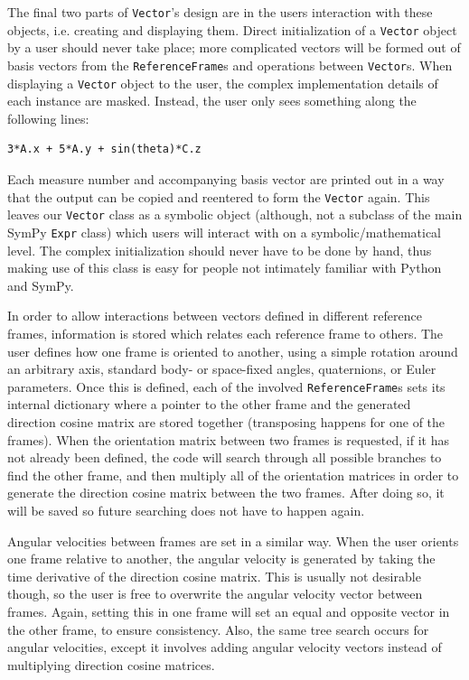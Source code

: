 \documentclass[twocolumn,10pt, final]{asme2e}
\begin{document}
The final two parts of \verb|Vector|'s design are in the users interaction with
these objects, i.e. creating and displaying them. Direct initialization of a
\verb|Vector| object by a user should never take place; more complicated
vectors will be formed out of basis vectors from the \verb|ReferenceFrame|s and
operations between \verb|Vector|s. When displaying a \verb|Vector| object to
the user, the complex implementation details of each instance are masked.
Instead, the user only sees something along the following lines:
\begin{verbatim}
3*A.x + 5*A.y + sin(theta)*C.z
\end{verbatim}
Each measure number and accompanying basis vector are printed out in a way that
the output can be copied and reentered to form the \verb|Vector| again.  This
leaves our \verb|Vector| class as a symbolic object (although, not a subclass
of the main SymPy \verb|Expr| class) which users will interact with on a
symbolic/mathematical level. The complex initialization should never have to be
done by hand, thus making use of this class is easy for people not intimately
familiar with Python and SymPy.

In order to allow interactions between vectors defined in different reference
frames, information is stored which relates each reference frame to others.
The user defines how one frame is oriented to another, using a simple rotation
around an arbitrary axis, standard body- or space-fixed angles, quaternions, or
Euler parameters. Once this is defined, each of the involved
\verb|ReferenceFrame|s sets its internal dictionary where a pointer to the
other frame and the generated direction cosine matrix are stored together
(transposing happens for one of the frames). When the orientation matrix
between two frames is requested, if it has not already been defined, the code
will search through all possible branches to find the other frame, and then
multiply all of the orientation matrices in order to generate the direction
cosine matrix between the two frames. After doing so, it will be saved so
future searching does not have to happen again.

Angular velocities between frames are set in a similar way.
When the user orients one frame relative to another, the angular velocity is
generated by taking the time derivative of the direction cosine matrix.
This is usually not desirable though, so the user is free to overwrite the
angular velocity vector between frames.
Again, setting this in one frame will set an equal and opposite vector in the
other frame, to ensure consistency.
Also, the same tree search occurs for angular velocities, except it involves
adding angular velocity vectors instead of multiplying direction cosine matrices.
\end{document}
